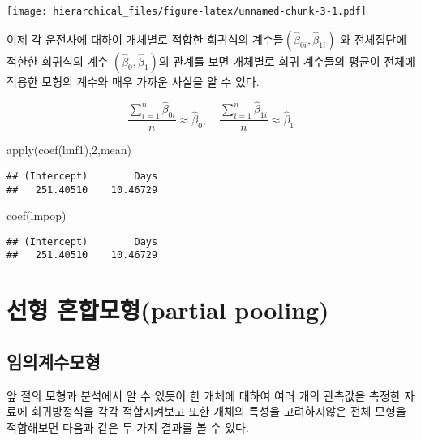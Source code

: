 \documentclass[
]{book}
\newenvironment{Shaded}{\begin{snugshade}}{\end{snugshade}}
\newcommand{\DecValTok}[1]{\textcolor[rgb]{0.00,0.00,0.81}{#1}}
\newcommand{\FunctionTok}[1]{\textcolor[rgb]{0.00,0.00,0.00}{#1}}
\newcommand{\NormalTok}[1]{#1}
\begin{document}
\texttt{[image: hierarchical\_files/figure-latex/unnamed-chunk-3-1.pdf]}

이제 각 운전사에 대하여 개체별로 적합한 회귀식의 계수들\((\hat \beta_{0i}, \hat \beta_{1i})\) 와 전체집단에 적한한 회귀식의 계수 \((\hat \beta_{0}, \hat \beta_{1})\)의 관계를 보면 개체별로 회귀 계수들의 평균이 전체에 적용한 모형의 계수와 매우 가까운 사실을 알 수 있다.

\[ 
\frac{\sum_{i=1}^n \hat \beta_{0i}}{n} \approx \hat \beta_{0}, \quad  \frac{\sum_{i=1}^n \hat \beta_{1i}}{n} \approx \hat \beta_{1}
\]

\begin{Shaded}
\begin{Highlighting}[]
\FunctionTok{apply}\NormalTok{(}\FunctionTok{coef}\NormalTok{(lmf1),}\DecValTok{2}\NormalTok{,mean)}
\end{Highlighting}
\end{Shaded}

\begin{verbatim}
## (Intercept)        Days 
##   251.40510    10.46729
\end{verbatim}

\begin{Shaded}
\begin{Highlighting}[]
\FunctionTok{coef}\NormalTok{(lmpop)}
\end{Highlighting}
\end{Shaded}

\begin{verbatim}
## (Intercept)        Days 
##   251.40510    10.46729
\end{verbatim}

\hypertarget{uxc120uxd615-uxd63cuxd569uxbaa8uxd615partial-pooling}{%
\section{선형 혼합모형(partial pooling)}\label{uxc120uxd615-uxd63cuxd569uxbaa8uxd615partial-pooling}}

\hypertarget{uxc784uxc758uxacc4uxc218uxbaa8uxd615}{%
\subsection{임의계수모형}\label{uxc784uxc758uxacc4uxc218uxbaa8uxd615}}

앞 절의 모형과 분석에서 알 수 있듯이 한 개체에 대하여 여러 개의 관측값을 측정한 자료에 회귀방정식을 각각 적합시켜보고 또한 개체의 특성을 고려하지않은 전체 모형을 적합해보면 다음과 같은 두 가지 결과를 볼 수 있다.
\end{document}
